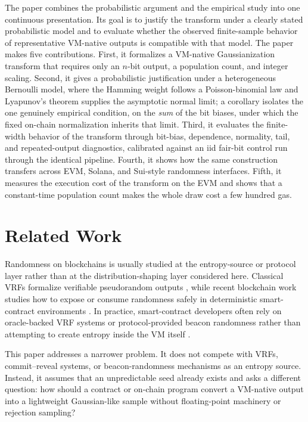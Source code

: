 \documentclass[11pt]{article}
\begin{document}
The paper combines the probabilistic argument and the empirical study into one
continuous presentation. Its goal is to justify the transform under a clearly
stated probabilistic model and to evaluate whether the observed finite-sample
behavior of representative VM-native outputs is compatible with that model.
The paper makes five contributions. First, it formalizes a VM-native
Gaussianization transform that requires only an $n$-bit output, a population
count, and integer scaling. Second, it gives a probabilistic justification
under a heterogeneous Bernoulli model, where the Hamming weight follows a
Poisson-binomial law and Lyapunov's theorem supplies the asymptotic normal
limit; a corollary isolates the one genuinely empirical condition, on the
\emph{sum} of the bit biases, under which the fixed on-chain normalization
inherits that limit. Third, it evaluates the finite-width behavior of the
transform through bit-bias, dependence, normality, tail, and repeated-output
diagnostics, calibrated against an iid fair-bit control run through the
identical pipeline. Fourth, it shows how the same construction transfers
across EVM, Solana, and Sui-style randomness interfaces. Fifth, it measures
the execution cost of the transform on the EVM and shows that a constant-time
population count makes the whole draw cost a few hundred gas.

\section{Related Work}

Randomness on blockchains is usually studied at the entropy-source or protocol
layer rather than at the distribution-shaping layer considered here. Classical
VRFs formalize verifiable pseudorandom outputs \citep{Micali1999}, while recent
blockchain work studies how to expose or consume randomness safely in
deterministic smart-contract environments \citep{Chatterjee2019,NativeVRF2023}.
In practice, smart-contract developers often rely on oracle-backed VRF systems
or protocol-provided beacon randomness rather than attempting to create entropy
inside the VM itself \citep{ChainlinkVRF,EIP4399,SuiRandomnessDocs}.

This paper addresses a narrower problem. It does not compete with VRFs,
commit--reveal systems, or beacon-randomness mechanisms as an entropy source.
Instead, it assumes that an unpredictable seed already exists and asks a
different question: how should a contract or on-chain program convert a
VM-native output into a lightweight Gaussian-like sample without floating-point
machinery or rejection sampling?
\end{document}

